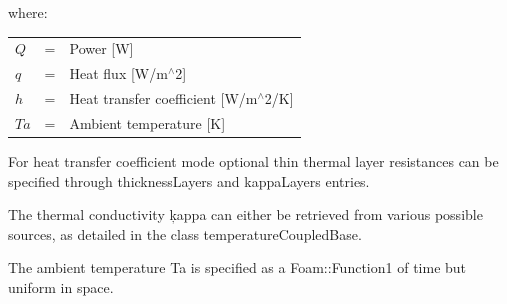 where\+: \tabulinesep=1mm
\begin{longtabu} spread 0pt [c]{*{3}{|X[-1]}|}
\hline
$ Q $ &= &Power \mbox{[}W\mbox{]}  \\
$ q $ &= &Heat flux \mbox{[}W/m$^\wedge$2\mbox{]}  \\
$ h $ &= &Heat transfer coefficient \mbox{[}W/m$^\wedge$2/K\mbox{]}  \\
$ Ta $ &= &Ambient temperature \mbox{[}K\mbox{]}  \\
\end{longtabu}
\begin{DoxyVerb}For heat transfer coefficient mode optional thin thermal layer resistances
can be specified through thicknessLayers and kappaLayers entries.

The thermal conductivity \c kappa can either be retrieved from various
possible sources, as detailed in the class temperatureCoupledBase.

The ambient temperature Ta is specified as a Foam::Function1 of time but
uniform in space.
\end{DoxyVerb}


